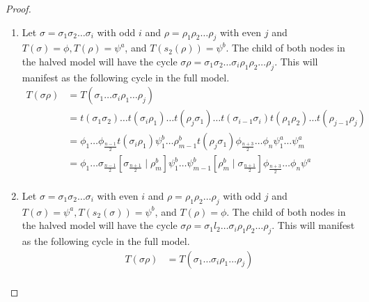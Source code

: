 \begin{proof} \phantom{x}
	\begin{enumerate}
		\item Let $\sigma = \sigma_1\sigma_2 \dots \sigma_i$ with odd $i$ and $\rho = \rho_1\rho_2 \dots \rho_j$ with even $j$ and $T(\sigma) = \phi, T(\rho) = \psi^a$, and $T(s_2(\rho)) = \psi^b$.
		      The child of both nodes in the halved model will have the cycle $\sigma\rho = \sigma_1\sigma_2 \dots \sigma_i \rho_1\rho_2 \dots \rho_j$.
		      This will manifest as the following cycle in the full model.
		      \begin{align*}
			      T(\sigma\rho) & = T(\sigma_1 \dots \sigma_i \rho_1 \dots \rho_j)                                                                              \\
			                    & =
			      t(\sigma_1\sigma_2) \dots t(\sigma_i \rho_1) \dots t(\rho_j \sigma_1) \dots t(\sigma_{i-1}\sigma_i) t(\rho_1\rho_2) \dots t(\rho_{j-1}\rho_j) \\
			                    & = \phi_1 \dots \phi_{\frac{n-1}{2}} t(\sigma_i \rho_1)
			      \psi^b_1 \dots \rho^b_{m-1} t(\rho_j \sigma_1)
			      \phi_{\frac{n+3}{2}} \dots \phi_n
			      \psi^a_1 \dots \psi^a_m                                                                                                                       \\
			                    & =
			      \phi_1 \dots \sigma_{\frac{n-1}{2}} \left[\sigma_{\frac{n+1}{2}} \mid \rho^b_m\right]
			      \psi^b_1 \dots \psi^b_{m-1} \left[\rho^b_m \mid \sigma_{\frac{n+1}{2}}\right]
			      \phi_{\frac{n+3}{2}} \dots \phi_n
			      \psi^a                                                                                                                                        \\
		      \end{align*}
		\item Let $\sigma = \sigma_1\sigma_2 \dots \sigma_i$ with even $i$ and $\rho = \rho_1\rho_2 \dots \rho_j$ with odd $j$ and $T(\sigma) = \psi^a, T(s_2(\sigma)) = \psi^b$, and $T(\rho) = \phi$.
		      The child of both nodes in the halved model will have the cycle $\sigma\rho = \sigma_1l_2 \dots \sigma_i \rho_1\rho_2 \dots \rho_j$.
		      This will manifest as the following cycle in the full model.
		      \begin{align*}
			      T(\sigma\rho) & = T(\sigma_1 \dots \sigma_i \rho_1 \dots \rho_j)                                                                                             \\

\end{align*}
\end{enumerate}
\end{proof}
